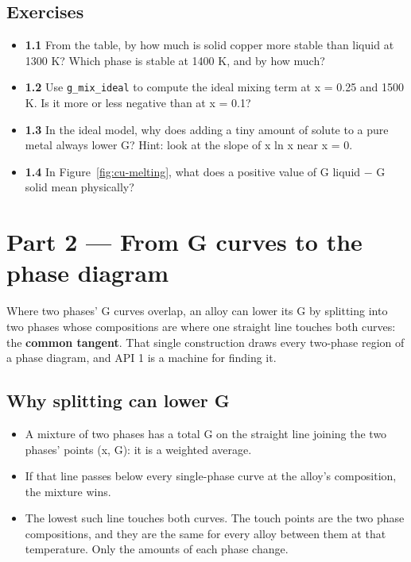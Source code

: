 \documentclass[12pt,a4paper]{article}
\begin{document}
\subsection*{Exercises}
\begin{itemize}
\item \textbf{1.1} From the table, by how much is solid copper more stable than liquid at 1300 K? Which phase is stable at 1400 K, and by how much?
\item \textbf{1.2} Use \texttt{g\_\allowbreak{}mix\_\allowbreak{}ideal} to compute the ideal mixing term at x = 0.25 and 1500 K. Is it more or less negative than at x = 0.1?
\item \textbf{1.3} In the ideal model, why does adding a tiny amount of solute to a pure metal always lower G? Hint: look at the slope of x ln x near x = 0.
\item \textbf{1.4} In Figure~\ref{fig:cu-melting}, what does a positive value of G liquid \(-\) G solid mean physically?
\end{itemize}

\section*{Part 2 --- From G curves to the phase diagram}
Where two phases' G curves overlap, an alloy can lower its G by splitting into two phases whose compositions are where one straight line touches both curves: the \textbf{common tangent}. That single construction draws every two-phase region of a phase diagram, and API 1 is a machine for finding it.


\subsection*{Why splitting can lower G}
\begin{itemize}
\item A mixture of two phases has a total G on the straight line joining the two phases' points (x, G): it is a weighted average.
\item If that line passes below every single-phase curve at the alloy's composition, the mixture wins.
\item The lowest such line touches both curves. The touch points are the two phase compositions, and they are the same for every alloy between them at that temperature. Only the amounts of each phase change.
\end{itemize}
\end{document}
